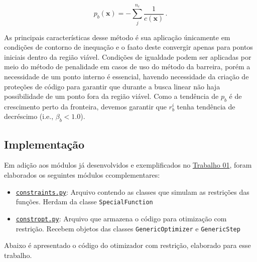 \documentclass[10pt, a4paper]{article}
\begin{document}
\begin{equation}\label{eq:barreira}
  p_b(\mathbf{x}) = - \sum_j^{n_c}\frac{1}{c(\mathbf{x})}\,.
\end{equation}

As principais características desse método é sua aplicação únicamente em condições de contorno de inequação e o faato deste convergir apenas para
pontos iniciais dentro da região viável. Condições de igualdade podem ser aplicadas por meio do método de penalidade em casos de uso do método da barreira,
porém a necessidade de um ponto interno é essencial, havendo necessidade da criação de proteções de código para garantir que durante a busca linear não haja
possibilidade de um ponto fora da região viável. Como a tendência de $p_b$ é de crescimento perto da fronteira, devemos garantir que $r_b^i$ tenha tendência 
de decréscimo (i.e., $\beta_b < 1.0$).

\subsection{Implementação}

Em adição aos módulos já desenvolvidos e exemplificados no \href{https://github.com/prj-phcp/MEC2403_Activities/blob/master/Trabalho1/Trabalho1.pdf}{Trabalho 01},
foram elaborados os seguintes módulos ccomplementares:


\begin{itemize}
  \item {\tt \href{https://github.com/prj-phcp/MEC2403_Activities/blob/master/packages/constraints.py}{constraints.py}}: Arquivo contendo as classes que simulam as
  restrições das funções. Herdam da classe {\tt SpecialFunction}
  \item {\tt \href{https://github.com/prj-phcp/MEC2403_Activities/blob/master/packages/constropt.py}{constropt.py}}: Arquivo que armazena o código para otimização
  com restrição. Recebem objetos das classes {\tt GenericOptimizer} e {\tt GenericStep}
\end{itemize}

Abaixo é apresentado o código do otimizador com restrição, elaborado para esse trabalho.
\end{document}
